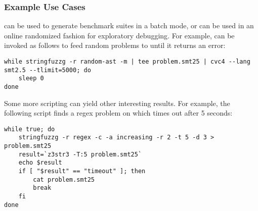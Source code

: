 \subsubsection{Example Use Cases}

\fuzzer{} can be used to
generate benchmark suites in a batch mode, or can be used in an online
randomized fashion for exploratory debugging. For example, \fuzzer{}
can be invoked as follows to feed random problems to \cvc{} until it
returns an error:
{\scriptsize\begin{verbatim}
while stringfuzzg -r random-ast -m | tee problem.smt25 | cvc4 --lang smt2.5 --tlimit=5000; do
    sleep 0
done\end{verbatim}}

Some more \unix{} scripting can yield other interesting results. For
example, the following script finds a regex problem on which \us{}
times out after 5 seconds:
{\scriptsize\begin{verbatim}while true; do
    stringfuzzg -r regex -c -a increasing -r 2 -t 5 -d 3 > problem.smt25
    result=`z3str3 -T:5 problem.smt25`
    echo $result
    if [ "$result" == "timeout" ]; then
        cat problem.smt25
        break
    fi
done\end{verbatim}}
